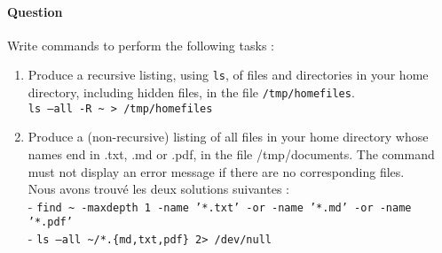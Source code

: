 \documentclass[a4paper,11pt]{article}
\newcounter{commande}[subsection]
\newcommand{\question}[1]{\addtocounter{commande}{1}

\paragraph{Question \arabic{commande}}#1\;}
\begin{document}
    \question{Write commands to perform the following tasks :}
    \begin{enumerate}
        \item Produce a recursive listing, using \texttt{ls}, of files and directories in your home directory, including hidden files, in the file \texttt{/tmp/homefiles}. \\\texttt{ls --all -R \textasciitilde{} > /tmp/homefiles}\\


        \item Produce a (non-recursive) listing of all files in your home directory whose names end in .txt, .md or .pdf, in the file /tmp/documents. The command must not display an error message if there are no corresponding files. \\Nous avons trouvé les deux solutions suivantes :\\- \texttt{find \textasciitilde{} -maxdepth 1 -name '*.txt' -or -name '*.md' -or -name '*.pdf'} \\- \texttt{ls --all \textasciitilde/*.\{md,txt,pdf\} 2> /dev/null}

    \end{enumerate}
\end{document}
